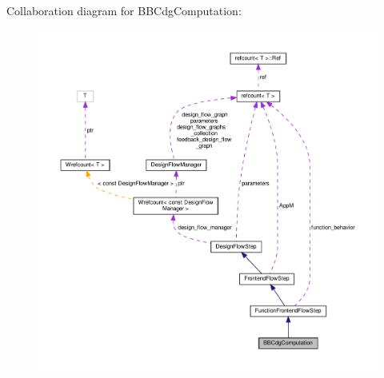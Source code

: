 Collaboration diagram for B\+B\+Cdg\+Computation\+:
\nopagebreak
\begin{figure}[H]
\begin{center}
\leavevmode
\includegraphics[width=350pt]{dd/d91/classBBCdgComputation__coll__graph}
\end{center}
\end{figure}

